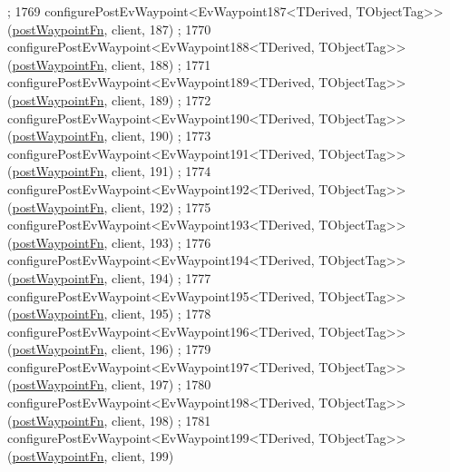 \begin{DoxyCode}
      ;
1769     configurePostEvWaypoint<EvWaypoint187<TDerived, TObjectTag>>(\hyperlink{classmove__base__z__client_1_1WaypointEventDispatcher_acc538eb7506c13f7cca2268a1742dadd}{postWaypointFn}, client, 187)
      ;
1770     configurePostEvWaypoint<EvWaypoint188<TDerived, TObjectTag>>(\hyperlink{classmove__base__z__client_1_1WaypointEventDispatcher_acc538eb7506c13f7cca2268a1742dadd}{postWaypointFn}, client, 188)
      ;
1771     configurePostEvWaypoint<EvWaypoint189<TDerived, TObjectTag>>(\hyperlink{classmove__base__z__client_1_1WaypointEventDispatcher_acc538eb7506c13f7cca2268a1742dadd}{postWaypointFn}, client, 189)
      ;
1772     configurePostEvWaypoint<EvWaypoint190<TDerived, TObjectTag>>(\hyperlink{classmove__base__z__client_1_1WaypointEventDispatcher_acc538eb7506c13f7cca2268a1742dadd}{postWaypointFn}, client, 190)
      ;
1773     configurePostEvWaypoint<EvWaypoint191<TDerived, TObjectTag>>(\hyperlink{classmove__base__z__client_1_1WaypointEventDispatcher_acc538eb7506c13f7cca2268a1742dadd}{postWaypointFn}, client, 191)
      ;
1774     configurePostEvWaypoint<EvWaypoint192<TDerived, TObjectTag>>(\hyperlink{classmove__base__z__client_1_1WaypointEventDispatcher_acc538eb7506c13f7cca2268a1742dadd}{postWaypointFn}, client, 192)
      ;
1775     configurePostEvWaypoint<EvWaypoint193<TDerived, TObjectTag>>(\hyperlink{classmove__base__z__client_1_1WaypointEventDispatcher_acc538eb7506c13f7cca2268a1742dadd}{postWaypointFn}, client, 193)
      ;
1776     configurePostEvWaypoint<EvWaypoint194<TDerived, TObjectTag>>(\hyperlink{classmove__base__z__client_1_1WaypointEventDispatcher_acc538eb7506c13f7cca2268a1742dadd}{postWaypointFn}, client, 194)
      ;
1777     configurePostEvWaypoint<EvWaypoint195<TDerived, TObjectTag>>(\hyperlink{classmove__base__z__client_1_1WaypointEventDispatcher_acc538eb7506c13f7cca2268a1742dadd}{postWaypointFn}, client, 195)
      ;
1778     configurePostEvWaypoint<EvWaypoint196<TDerived, TObjectTag>>(\hyperlink{classmove__base__z__client_1_1WaypointEventDispatcher_acc538eb7506c13f7cca2268a1742dadd}{postWaypointFn}, client, 196)
      ;
1779     configurePostEvWaypoint<EvWaypoint197<TDerived, TObjectTag>>(\hyperlink{classmove__base__z__client_1_1WaypointEventDispatcher_acc538eb7506c13f7cca2268a1742dadd}{postWaypointFn}, client, 197)
      ;
1780     configurePostEvWaypoint<EvWaypoint198<TDerived, TObjectTag>>(\hyperlink{classmove__base__z__client_1_1WaypointEventDispatcher_acc538eb7506c13f7cca2268a1742dadd}{postWaypointFn}, client, 198)
      ;
1781     configurePostEvWaypoint<EvWaypoint199<TDerived, TObjectTag>>(\hyperlink{classmove__base__z__client_1_1WaypointEventDispatcher_acc538eb7506c13f7cca2268a1742dadd}{postWaypointFn}, client, 199)

\end{DoxyCode}
